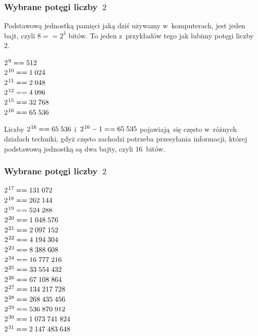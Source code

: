 \documentclass[10pt,t]{beamer}
\begin{document}
\begin{frame}
  \frametitle{Wybrane potęgi liczby~$2$}


  Podstawową jednostką pamięci jaką dziś używamy w~komputerach, jest
  jeden bajt, czyli $8 == 2^{ 3 }$ bitów. To jeden z~przykładów tego jak
  lubimy potęgi liczby~$2$.

  $2^{ \hspace{0.07em} 9 } == 512$ \\[0.1em]
  $2^{ \hspace{0.07em} 10 } == 1 \; 024$ \\[0.1em]
  $2^{ \hspace{0.07em} 11 } == 2 \; 048$ \\[0.1em]
  $2^{ \hspace{0.07em} 12 } == 4 \; 096$ \\[0.1em]
  $2^{ \hspace{0.07em} 15 } == 32 \; 768$ \\[0.1em]
  $2^{ \hspace{0.07em} 16 } == 65 \; 536$

  Liczby $2^{ \hspace{0.07em} 16 } == 65 \; 536$
  i~$2^{ \hspace{0.07em} 16 } - 1 == 65 \; 535$ pojawiają~się
  często w~różnych działach techniki, gdyż często zachodzi potrzeba
  przesyłania informacji, której podstawową jednostką są dwa bajty,
  czyli $16$~bitów.

\end{frame}





\begin{frame}
  \frametitle{Wybrane potęgi liczby~$2$}


  $2^{ \hspace{0.07em} 17 } == 131 \; 072$ \\[0.1em]
  $2^{ \hspace{0.07em} 18 } == 262 \; 144$ \\[0.1em]
  $2^{ \hspace{0.07em} 19 } == 524 \; 288$ \\[0.1em]
  $2^{ \hspace{0.07em} 20 } == 1 \; 048 \; 576$ \\[0.1em]
  $2^{ \hspace{0.07em} 21 } == 2 \; 097 \; 152$ \\[0.1em]
  $2^{ \hspace{0.07em} 22 } == 4 \; 194 \; 304$ \\[0.1em]
  $2^{ \hspace{0.07em} 23 } == 8 \; 388 \; 608$ \\[0.1em]
  $2^{ \hspace{0.07em} 24 } == 16 \; 777 \; 216$ \\[0.1em]
  $2^{ \hspace{0.07em} 25 } == 33 \; 554 \; 432$ \\[0.1em]
  $2^{ \hspace{0.07em} 26 } == 67 \; 108 \; 864$ \\[0.1em]
  $2^{ \hspace{0.07em} 27 } == 134 \; 217 \; 728$ \\[0.1em]
  $2^{ \hspace{0.07em} 28 } == 268 \; 435 \; 456$ \\[0.1em]
  $2^{ \hspace{0.07em} 29 } == 536 \; 870 \; 912$ \\[0.1em]
  $2^{ \hspace{0.07em} 30 } == 1 \; 073 \; 741 \; 824$ \\[0.1em]
  $2^{ \hspace{0.07em} 31 } == 2 \; 147 \; 483 \; 648$

\end{frame}
\end{document}
